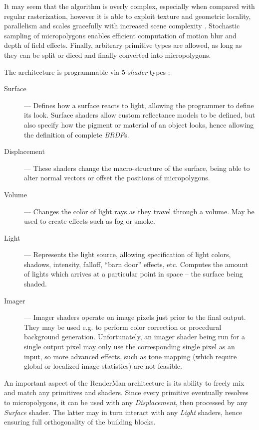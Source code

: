 It may seem that the algorithm is overly complex, especially when compared with regular rasterization, however it is able to exploit texture and geometric locality, parallelism and scales gracefully with increased scene complexity \cite{Cook87reyes}. Stochastic sampling of micropolygons enables efficient computation of motion blur and depth of field effects. Finally, arbitrary primitive types are allowed, as long as they can be split or diced and finally converted into micropolygons.

The architecture is programmable via 5 \emph{shader} types \cite{keyframeRSL1}:

\begin{description}
\item[Surface] --- Defines how a surface reacts to light, allowing the programmer to define its look. Surface shaders allow custom reflectance models to be defined, but also specify how the pigment or material of an object looks, hence allowing the definition of complete \emph{BRDF}s.
\item[Displacement] --- These shaders change the macro-structure of the surface, being able to alter normal vectors or offset the positions of micropolygons.
\item[Volume] --- Changes the color of light rays as they travel through a volume. May be used to create effects such as fog or smoke.
\item[Light] --- Represents the light source, allowing specification of light colors, shadows, intensity, falloff, ``barn door'' effects, etc. Computes the amount of lights which arrives at a particular point in space -- the surface being shaded.
\item[Imager] --- Imager shaders operate on image pixels just prior to the final output. They may be used e.g. to perform color correction or procedural background generation. Unfortunately, an imager shader being run for a single output pixel may only use the corresponding single pixel as an input, so more advanced effects, such as tone mapping (which require global or localized image statistics) are not feasible.
\end{description}

An important aspect of the RenderMan architecture is its ability to freely mix and match any primitives and shaders. Since every primitive eventually resolves to micropolygons, it can be used with any \emph{Displacement}, then processed by any \emph{Surface} shader. The latter may in turn interact with any \emph{Light} shaders, hence ensuring full orthogonality of the building blocks.


